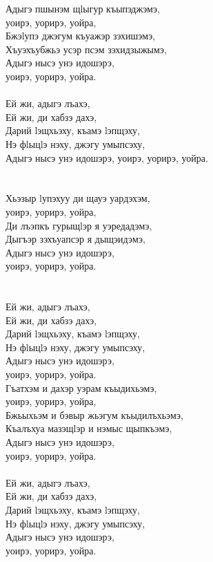 \documentclass[a4paper,12pt]{book}
\newcommand{\1}[1]{\textbf{\emph{#1}}} %
\newcommand{\2}[1]{\textbf{[#1]}} %
\newcommand{\3}[1]{\fontsize{11pt}{0cm}\textbf{\emph{#1}}} %
\newcommand{\4}[1]{\fontsize{10pt}{0cm}\emph{#1}}	%
\newcommand{\5}[1]{\textbf{/#1/}} %
\newcommand{\6}[1]{\textbf{[#1]}} %
\newcommand{\7}[1]{\fontsize{12pt}{0cm}\emph{#1}} %
\newcommand{\8}[1]{\fontsize{12pt}{0cm}`#1'} %
\newcommand{\9}[1]{\fontsize{12pt}{0cm}(lit. `#1')} %
\begin{document}
Адыгэ пшынэм щlыгур къыпэджэмэ, \\
уоирэ, уорирэ, уойра,\\
Бжэlупэ джэгум къуажэр зэхишэмэ,\\
Хъуэхъубжьэ усэр псэм зэхидзыжымэ,\\
Адыгэ нысэ унэ идошэрэ, \\
уоирэ, уорирэ, уойра.\\
\\
Ей жи, адыгэ лъахэ,\\
Ей жи, ди хабзэ дахэ,\\
Дарий lэщхьэху, къамэ lэпщэху,\\
Нэ фlыцlэ нэху, джэгу умыпсэху,\\
Адыгэ нысэ унэ идошэрэ, уоирэ, уорирэ, уойра.\\
\\\\
Хьэзыр lупэхуу ди щауэ уардэхэм,\\
уоирэ, уорирэ, уойра,\\
Ди лъэпкъ гурыщlэр я уэредадэмэ,\\
Дыгъэр зэхъуапсэр я дыщэидэмэ,\\
Адыгэ нысэ унэ идошэрэ,\\
уоирэ, уорирэ, уойра.\\
\\\\
Ей жи, адыгэ лъахэ,\\
Ей жи, ди хабзэ дахэ,\\
Дарий lэщхьэху, къамэ lэпщэху,\\
Нэ фlыцlэ нэху, джэгу умыпсэху,\\
Адыгэ нысэ унэ идошэрэ,\\
уоирэ, уорирэ, уойра.\\

Гъатхэм и дахэр уэрам къыдихьэмэ,\\
уоирэ, уорирэ, уойра,\\
Бжьыхьэм и бэвыр жьэгум къыдилъхьэмэ,\\
Къалъхуа мазэщlэр и нэмыс щыпкъэмэ,\\
Адыгэ нысэ унэ идошэрэ,\\
уоирэ, уорирэ, уойра.\\
\\
Ей жи, адыгэ лъахэ,\\
Ей жи, ди хабзэ дахэ,\\
Дарий lэщхьэху, къамэ lэпщэху,\\
Нэ фlыцlэ нэху, джэгу умыпсэху,\\
Адыгэ нысэ унэ идошэрэ,\\
уоирэ, уорирэ, уойра.\\
\end{document}
